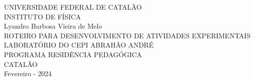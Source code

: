 \documentclass[12pt,a4paper]{article}
\begin{document}
	\begin{titlepage}
		\begin{center}
			UNIVERSIDADE FEDERAL DE CATALÃO\\
			INSTITUTO DE FÍSICA\\\vspace{5cm}
			Lyandro Barbosa Vieira de Melo\\\vspace{4cm}
			ROTEIRO PARA DESENVOLVIMENTO DE ATIVIDADES EXPERIMENTAIS\\
			LABORATÓRIO DO CEPI ABRAHÃO ANDRÉ\\\vspace{4cm}
			PROGRAMA RESIDÊNCIA PEDAGÓGICA\\\vspace{7cm}
			CATALÃO\\
			Fevereiro - 2024
		\end{center}
	\end{titlepage}
\end{document}
